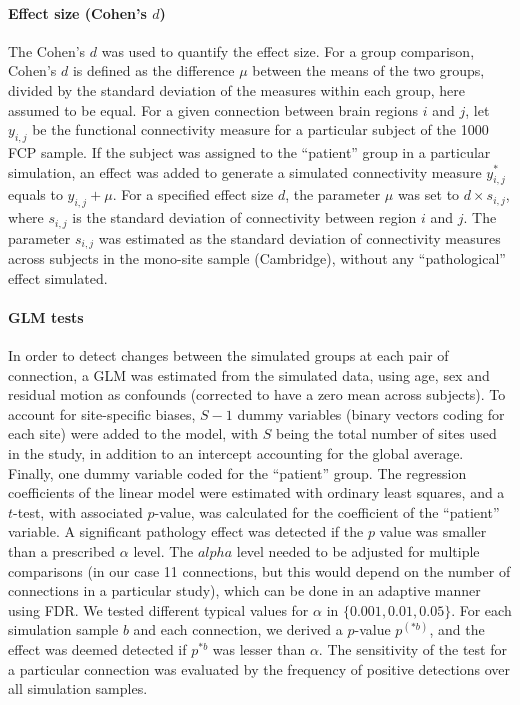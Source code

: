 \documentclass[authoryear]{elsarticle}
\begin{document}
\paragraph{Effect size (Cohen's $d$)}
The Cohen's $d$ was used to quantify the effect size. For a group comparison, Cohen's $d$ is defined as the difference $\mu$ between the means of the two groups, divided by the standard deviation of the measures within each group, here assumed to be equal. For a given connection between brain regions $i$ and $j$, let $y_{i,j}$ be the functional connectivity measure for a particular subject of the 1000 FCP sample. If the subject was assigned to the ``patient'' group in a particular simulation, an effect was added to generate a simulated connectivity measure $y_{i,j}^*$ equals to $y_{i,j} + \mu$. For a specified effect size $d$, the parameter $\mu$ was set to $d\times s_{i,j}$, where $s_{i,j}$ is the standard deviation of connectivity between region $i$ and $j$. The parameter $s_{i,j}$ was estimated as the standard deviation of connectivity measures across subjects in the mono-site sample (Cambridge), without any ``pathological'' effect simulated.

\paragraph{GLM tests}
In order to detect changes between the simulated groups at each pair of connection, a GLM was estimated from the simulated data, using age, sex and residual motion as confounds (corrected to have a zero mean across subjects). To account for site-specific biases, $S-1$ dummy variables (binary vectors coding for each site) were added to the model, with $S$ being the total number of sites used in the study, in addition to an intercept accounting for the global average. Finally, one dummy variable coded for the ``patient'' group. The regression coefficients of the linear model were estimated with ordinary least squares, and a $t$-test, with associated $p$-value, was calculated for the coefficient of the ``patient'' variable. A significant pathology effect was detected if the $p$ value was smaller than a prescribed $\alpha$ level. The $alpha$ level needed to be adjusted for multiple comparisons (in our case 11 connections, but this would depend on the number of connections in a particular study), which can be done in an adaptive manner using FDR. We tested different typical values for $\alpha$ in $\{0.001,0.01,0.05\}$. For each simulation sample $b$ and each connection, we derived a $p$-value $p^{(*b)}$, and the effect was deemed detected if $p^{*b}$ was lesser than $\alpha$. The sensitivity of the test for a particular connection was evaluated by the frequency of positive detections over all simulation samples.
\end{document}
